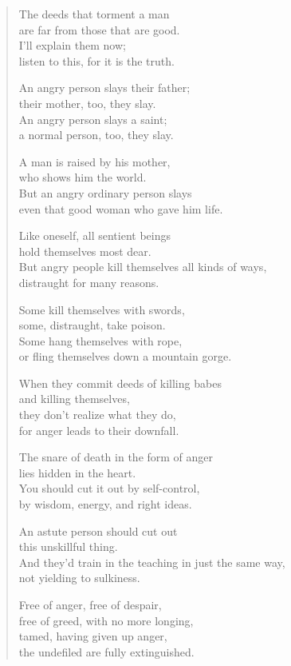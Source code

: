 \documentclass[12pt,openany]{book}%
\begin{document}
\begin{verse}
The deeds that torment a man \\
are far from those that are good. \\
I’ll explain them now; \\
listen to this, for it is the truth. 

An angry person slays their father; \\
their mother, too, they slay. \\
An angry person slays a saint; \\
a normal person, too, they slay. 

A man is raised by his mother, \\
who shows him the world. \\
But an angry ordinary person slays \\
even that good woman who gave him life. 

Like oneself, all sentient beings \\
hold themselves most dear. \\
But angry people kill themselves all kinds of ways, \\
distraught for many reasons. 

Some kill themselves with swords, \\
some, distraught, take poison. \\
Some hang themselves with rope, \\
or fling themselves down a mountain gorge. 

When they commit deeds of killing babes \\
and killing themselves, \\
they don’t realize what they do, \\
for anger leads to their downfall. 

The snare of death in the form of anger \\
lies hidden in the heart. \\
You should cut it out by self-control, \\
by wisdom, energy, and right ideas. 

An astute person should cut out \\
this unskillful thing. \\
And they’d train in the teaching in just the same way, \\
not yielding to sulkiness. 

Free of anger, free of despair, \\
free of greed, with no more longing, \\
tamed, having given up anger, \\
the undefiled are fully extinguished. 

%
\end{verse}
\end{document}
